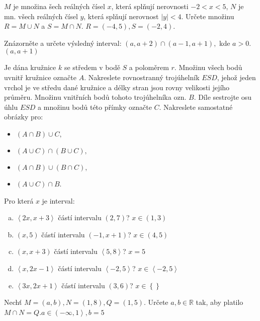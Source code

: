 \begin{example}[SÚM 171/26]
  $M$ je množina šech reálných čísel $x$, která splňují nerovnosti $-2<x<5$, $N$ je mn. všech reálných čísel $y$, která splňují nerovnost $|y|<4$. Určete množinu $R=M\cup N$ a $S = M\cap N.$ \hfill $R = (-4,5), S=(-2,4).$
\end{example}

\begin{example}[SÚM 172/29f]
  Znázorněte a určete výsledný interval: $(a,a+2)\cap (a-1,a+1),$ kde $a>0.$\hfill$(a,a+1)$
\end{example}

\begin{example}[SÚM (172/33)]
  Je dána kružnice $k$ se středem v bodě  $S$ a poloměrem $r$. Množinu všech bodů uvnitř kružnice označte $A$. Nakreslete rovnostranný trojúhelník $ESD$, jehož jeden vrchol je ve středu dané kružnice a délky stran jsou rovny velikosti jejího průměru. Množinu vnitřních bodů tohoto trojúhelníka ozn. $B$. Díle sestrojte osu úhlu $ESD$ a množinu bodů této přímky označte $C$. Nakreslete samostatné obrázky pro:
  \begin{itemize}
    \item $(A\cap B)\cup C,$
    \item $(A\cup C) \cap (B\cup C),$
    \item $(A\cap B) \cup (B\cap C),$
    \item $(A\cup C) \cap B$.
  \end{itemize}
\end{example}

\begin{example}[SÚM 173/34]
  Pro která $x$ je interval:
  \begin{enumerate}[a.]
    \item $\left<2x,x+3\right>$ částí intervalu $(2,7)$? \hfill $x \in (1,3)$
    \item $(x,5)$ částí intervalu $\left(-1,x+1\right)$? \hfill $x\in (4,5)$
    \item $(x,x+3)$ částí intervalu $\left<5,8\right>$? \hfill $x=5$
    \item $\left<x,2x-1\right>$ částí intervalu $\left<-2,5\right>$? \hfill $x\in\left<-2,5\right>$
    \item $\left<3x,2x+1\right>$ částí intervalu $(3,6)$? \hfill $x\in \left\{\right\}$
  \end{enumerate}
\end{example}

\begin{example}[SÚM 173/35]
  Nechť $M = (a,b), N = (1,8), Q = (1,5)$. Určete $a,b \in \mathbb{R}$ tak, aby platilo $M\cap N = Q$.\hfill $a\in \left(-\infty, 1\right>, b=5$
\end{example}

